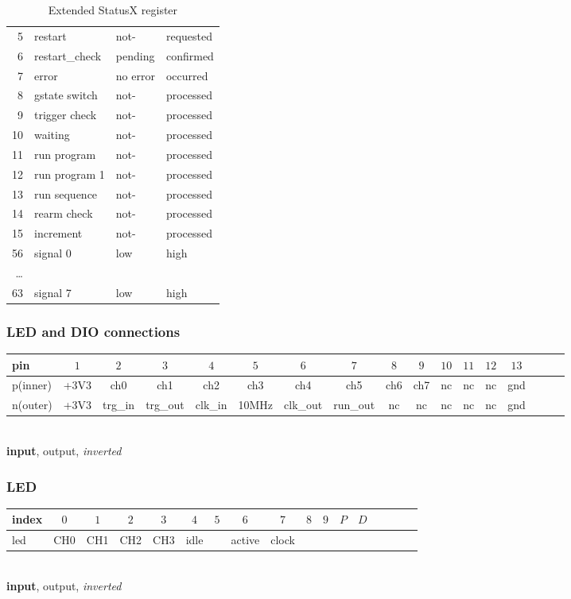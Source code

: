\documentclass{article}
\begin{document}
\begin{table}[htb]
\begin{minipage}{.5\textwidth}
\begin{tabular}{rlll}
		 5  & restart  	  	  & not-	  	  	& requested   \\
		 6  & restart\_check  & pending				& confirmed   \\
		 7  & error           & no error      & occurred    \\\hline
		 8  & gstate switch   & not-          & processed   \\
		 9  & trigger check   & not-          & processed   \\
		10  & waiting         & not-          & processed   \\
		11  & run program     & not-          & processed   \\
		12  & run program 1   & not-          & processed   \\
		13  & run sequence    & not-          & processed   \\
		14  & rearm check     & not-          & processed   \\
		15  & increment       & not-          & processed   \\\hline
		56  & signal 0        & low           & high        \\
		\dots  &&&\\
		63  & signal 7        & low           & high        \\
		\end{tabular}
	\caption{Extended StatusX register}
	\label{statusx_register}
  \end{minipage}
\end{table}

\subsubsection*{LED and DIO connections}
	\begin{tabular}[t]{l||cccccccccccccccc}
		pin      & $1$  & $2$    & $3$       & $4$     & $5$   & $6$      & $7$      & $8$  & $9$  & $10$  & $11$  & $12$ & $13$ \\\hline
		p(inner) & +3V3 & ch0    & ch1       & ch2     & ch3   & ch4      & ch5      & ch6  & ch7  & nc    & nc    & nc   & gnd  \\\hline
		n(outer) & +3V3 & trg\_in & trg\_out & clk\_in & 10MHz & clk\_out & run\_out & nc   & nc   & nc    & nc    & nc   & gnd  \\
	\end{tabular}	\\\textbf{input}, output, \textit{inverted}\\
\subsubsection*{LED}
	\begin{tabular}[t]{l||cc|cc|cc|cc|cc|cc|cc|cc}
		index & $0$  & $1$  & $2$  & $3$  & $4$ & $5$ & $6$ & $7$  & $8$  & $9$  & $P$  & $D$\\\hline
		led  & CH0  & CH1  & CH2 & CH3 & idle& & active & clock \\\hline
		\end{tabular}	\\\textbf{input}, output, \textit{inverted}\\
\end{document}
